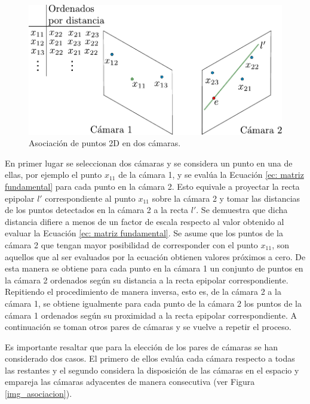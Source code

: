 \begin{figure}[ht!]
\hspace{0.3cm}
\includegraphics[scale=0.7]{img/Reconstruccion/cam2cam2}
\caption{Asociación de puntos 2D en dos cámaras.}
\label{fig: cam2cam }
\end{figure}

En primer lugar se seleccionan dos cámaras y se considera un punto en una de ellas, por ejemplo el punto $x_{11}$ de la cámara 1, y se evalúa la Ecuación \ref{ec: matriz fundamental} para cada punto en la cámara 2. Esto equivale a proyectar la recta epipolar $l'$ correspondiente al punto $x_{11}$ sobre la cámara 2  y tomar las distancias de los puntos detectados en la cámara 2 a la recta $l'$. Se demuestra que dicha distancia difiere a menos de un factor de escala respecto al valor obtenido al evaluar la Ecuación \ref{ec: matriz fundamental}. Se asume que los puntos de la cámara 2 que tengan mayor posibilidad de corresponder con el punto $x_{11}$, son aquellos que al ser evaluados por la ecuación obtienen valores próximos a cero.
De esta manera se obtiene para cada punto en la cámara 1 un conjunto de puntos en la cámara 2 ordenados según su distancia a la recta epipolar correspondiente.
Repitiendo el procedimiento de manera inversa, esto es, de la cámara 2 a la cámara 1, se obtiene igualmente para cada punto de la cámara 2  los puntos de la cámara 1 ordenados según su proximidad a la recta epipolar correspondiente. A continuación se toman otros pares de cámaras y se vuelve a repetir el proceso. 

Es importante resaltar que para la elección de los pares de cámaras se han considerado dos casos.
El primero de ellos evalúa cada cámara respecto a todas las restantes y el segundo considera la disposición de las cámaras en el espacio y empareja las cámaras adyacentes de manera consecutiva (ver Figura \ref{img_asociacion}). %

